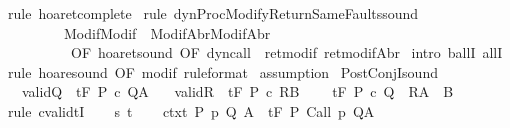 \begin{isabellebody}
%
\isadelimproof
%
\endisadelimproof
%
\isatagproof
{}\isamarkupfalse%
\ {\isacharparenleft}rule\ hoaret{\isacharunderscore}complete{\isacharprime}{\isacharparenright}\isanewline
{}\isamarkupfalse%
\ {\isacharparenleft}rule\ dynProcModifyReturnSameFaults{\isacharunderscore}sound\ \isanewline
\ \ \ \ \ \ \ \ {\isacharbrackleft}\ Modif{\isacharequal}Modif\ \ ModifAbr{\isacharequal}ModifAbr{\isacharcomma}\isanewline
\ \ \ \ \ \ \ \ \ \ OF\ hoaret{\isacharunderscore}sound\ {\isacharbrackleft}OF\ dyn{\isacharunderscore}call{\isacharbrackright}\ {\isacharunderscore}\ ret{\isacharunderscore}modif\ ret{\isacharunderscore}modifAbr{\isacharbrackright}{\isacharparenright}\isanewline
{}\isamarkupfalse%
\ {\isacharparenleft}intro\ ballI\ allI{\isacharparenright}\isanewline
{}\isamarkupfalse%
\ {\isacharparenleft}rule\ hoare{\isacharunderscore}sound\ {\isacharbrackleft}OF\ modif\ {\isacharbrackleft}rule{\isacharunderscore}format{\isacharbrackright}{\isacharbrackright}{\isacharparenright}\isanewline
{}\isamarkupfalse%
\ assumption\isanewline
{}\isamarkupfalse%
%
\endisatagproof
{\isafoldproof}%
%
\isadelimproof
%
\endisadelimproof
%
\isamarkuptrue%
\isamarkupfalse%
\ PostConjI{\isacharunderscore}sound{\isacharcolon}\isanewline
\ \ \ valid{\isacharunderscore}Q{\isacharcolon}\ {\isachardoublequoteopen}{\isasymGamma}{\isacharcomma}{\isasymTheta}\ {\isasymTurnstile}\isactrlsub t\isactrlbsub {\isacharslash}F\isactrlesub \ P\ c\ Q{\isacharcomma}A{\isachardoublequoteclose}\isanewline
\ \ \ valid{\isacharunderscore}R{\isacharcolon}\ {\isachardoublequoteopen}{\isasymGamma}{\isacharcomma}{\isasymTheta}\ {\isasymTurnstile}\isactrlsub t\isactrlbsub {\isacharslash}F\isactrlesub \ P\ c\ R{\isacharcomma}B{\isachardoublequoteclose}\isanewline
\ \ \ {\isachardoublequoteopen}{\isasymGamma}{\isacharcomma}{\isasymTheta}\ {\isasymTurnstile}\isactrlsub t\isactrlbsub {\isacharslash}F\isactrlesub \ P\ c\ {\isacharparenleft}Q\ {\isasyminter}\ R{\isacharparenright}{\isacharcomma}{\isacharparenleft}A\ {\isasyminter}\ B{\isacharparenright}{\isachardoublequoteclose}\isanewline
%
\isadelimproof
%
\endisadelimproof
%
\isatagproof
{}\isamarkupfalse%
\ {\isacharparenleft}rule\ cvalidtI{\isacharparenright}\isanewline
\ \ \isamarkupfalse%
\ s\ t\isanewline
\ \ \isamarkupfalse%
\ ctxt{\isacharcolon}\ {\isachardoublequoteopen}{\isasymforall}{\isacharparenleft}P{\isacharcomma}\ p{\isacharcomma}\ Q{\isacharcomma}\ A{\isacharparenright}{\isasymin}{\isasymTheta}{\isachardot}\ {\isasymGamma}\ {\isasymTurnstile}\isactrlsub t\isactrlbsub {\isacharslash}F\isactrlesub \ P\ {\isacharparenleft}Call\ p{\isacharparenright}\ Q{\isacharcomma}A{\isachardoublequoteclose}\isanewline

\end{isabellebody}

